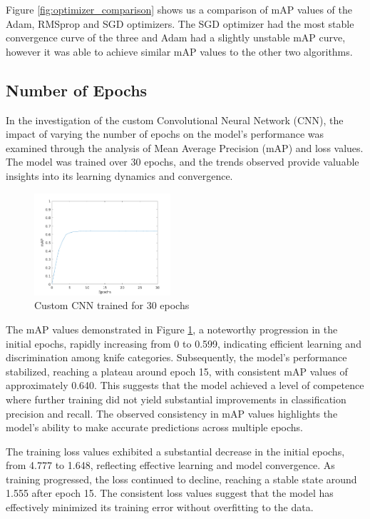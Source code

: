 \documentclass[10pt,twocolumn,letterpaper]{article}
\begin{document}
Figure \ref{fig:optimizer_comparison} shows us a comparison of mAP values of the Adam, RMSprop and SGD optimizers. The
SGD optimizer had the most stable convergence curve of the three and Adam had a slightly unstable mAP curve, however it
was able to achieve similar mAP values to the other two algorithms.

\subsection{Number of Epochs}

In the investigation of the custom Convolutional Neural Network (CNN), the impact of varying the number of epochs on
the model's performance was examined through the analysis of Mean Average Precision (mAP) and loss values. The model
was trained over 30 epochs, and the trends observed provide valuable insights into its learning dynamics and convergence.

\begin{figure}[htbp]
  \begin{center}
    \includegraphics[width=0.45\textwidth]{./assets/epoch_comparison.png}
    \captionsetup{justification=centering}
    \caption{Custom CNN trained for 30 epochs}
    \label{fig:epoch_comparison}
  \end{center}
\end{figure}

The mAP values demonstrated in Figure \ref{fig:epoch_comparison}, a noteworthy progression in the initial epochs, rapidly increasing from 0 to 0.599,
indicating efficient learning and discrimination among knife categories. Subsequently, the model's performance
stabilized, reaching a plateau around epoch 15, with consistent mAP values of approximately 0.640. This suggests that
the model achieved a level of competence where further training did not yield substantial improvements in
classification precision and recall. The observed consistency in mAP values highlights the model's ability to make
accurate predictions across multiple epochs.

The training loss values exhibited a substantial decrease in the initial epochs, from 4.777 to 1.648, reflecting
effective learning and model convergence. As training progressed, the loss continued to decline, reaching a stable
state around 1.555 after epoch 15. The consistent loss values suggest that the model has effectively minimized its
training error without overfitting to the data.
\end{document}
